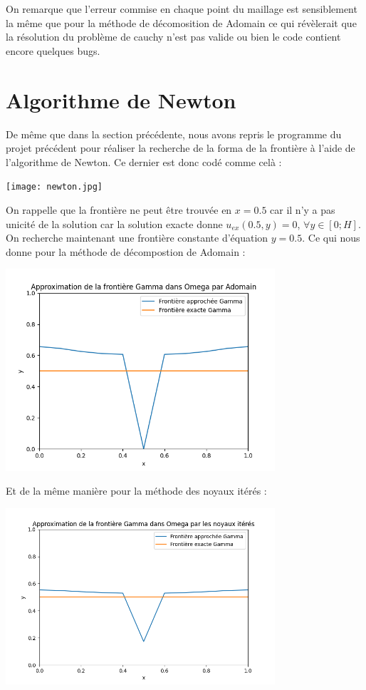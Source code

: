 \documentclass{article}
\begin{document}
    On remarque que l'erreur commise en chaque point du maillage est sensiblement la même que pour la méthode de décomosition de Adomain ce qui révèlerait que la résolution du problème de cauchy n'est pas valide ou bien le code contient encore quelques bugs.
    
\section{Algorithme de Newton}

    De même que dans la section précédente, nous avons repris le programme du projet précédent pour réaliser la recherche de la forma de la frontière à l'aide de l'algorithme de Newton. Ce dernier est donc codé comme celà :\\

    {
\texttt{[image: newton.jpg]} \par}
\bigskip
On rappelle que la frontière ne peut être trouvée en $x=0.5$ car il n'y a pas unicité de la solution car la solution exacte donne $u_{ex}(0.5,y) = 0$, $\forall  y \in [0;H]$.
On recherche maintenant une frontière constante d'équation $y = 0.5$. Ce qui nous donne pour la méthode de décompostion de Adomain :


    {
\includegraphics[width=10cm]{frontiere_constante_adomain.png} \par}
\bigskip

Et de la même manière pour la méthode des noyaux itérés :

    {
\includegraphics[width=10cm]{frontiere_constante_noyaux.png} \par}
\bigskip
\end{document}
